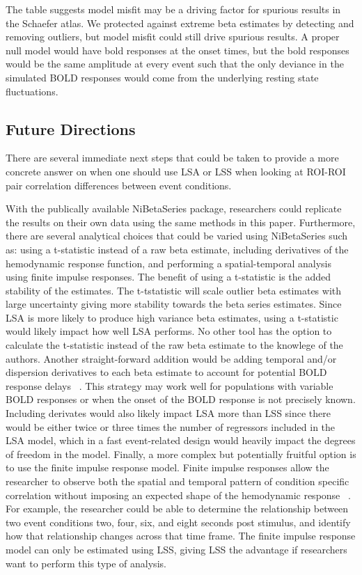 \documentclass[10pt,letterpaper]{article}
\begin{document}
The table suggests model misfit may be a driving factor for spurious results in the Schaefer atlas.
We protected against extreme beta estimates by detecting and removing outliers, but model misfit
could still drive spurious results.
A proper null model would have bold responses at the onset times, but the bold responses
would be the same amplitude at every event such that the only deviance in the simulated
BOLD responses would come from the underlying resting state fluctuations.

\subsection*{Future Directions}

There are several immediate next steps that could be taken to provide a more concrete answer
on when one should use LSA or LSS when looking at ROI-ROI pair correlation differences between event
conditions.

With the publically available NiBetaSeries package, researchers could replicate the
results on their own data using the same methods in this paper.
Furthermore, there are several analytical choices that could be varied using NiBetaSeries such as:
using a t-statistic instead of a raw beta estimate, including derivatives of the hemodynamic response function,
and performing a spatial-temporal analysis using finite impulse responses.
The benefit of using a t-statistic is the added stability of the estimates.
The t-tstatistic will scale outlier beta estimates with large uncertainty giving more stability
towards the beta series estimates.
Since LSA is more likely to produce high variance beta estimates, using a t-statistic would likely impact
how well LSA performs.
No other tool has the option to calculate the t-statistic instead of the raw beta estimate to the knowlege
of the authors.
Another straight-forward addition would be adding temporal and/or dispersion derivatives to each beta
estimate to account for potential BOLD response delays ~\cite{Calhoun2004,Gottlich2015}.
This strategy may work well for populations with variable BOLD responses or when the onset of the BOLD
response is not precisely known.
Including derivates would also likely impact LSA more than LSS since there would be either twice or
three times the number of regressors included in the LSA model, which in a fast event-related design
would heavily impact the degrees of freedom in the model.
Finally, a more complex but potentially fruitful option is to use the finite impulse response model.
Finite impulse responses allow the researcher to observe both the spatial and temporal pattern of
condition specific correlation without imposing an expected shape of the hemodynamic response ~\cite{Turner2012a}.
For example, the researcher could be able to determine the relationship between two event conditions
two, four, six, and eight seconds post stimulus, and identify how that relationship changes across
that time frame.
The finite impulse response model can only be estimated using LSS, giving LSS the advantage if researchers
want to perform this type of analysis.
\end{document}
